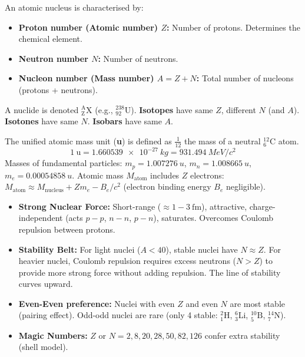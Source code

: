\documentclass[11pt]{article}
\begin{document}
\begin{definition}
An atomic nucleus is characterised by:
\begin{itemize}
\item \textbf{Proton number (Atomic number) $Z$:} Number of protons. Determines the chemical element.
\item \textbf{Neutron number $N$:} Number of neutrons.
\item \textbf{Nucleon number (Mass number) $A = Z + N$:} Total number of nucleons (protons + neutrons).
\end{itemize}
A nuclide is denoted $\ensuremath{\mathrm{^{A}_{Z}X}}$ (e.g., $\ensuremath{\mathrm{^{238}_{92}U}}$). \textbf{Isotopes} have same $Z$, different $N$ (and $A$). \textbf{Isotones} have same $N$. \textbf{Isobars} have same $A$.
\end{definition}

\begin{definition}
The unified atomic mass unit (\textbf{u}) is defined as $\frac{1}{12}$ the mass of a neutral $\ensuremath{\mathrm{^{12}_{6}C}}$ atom.
\[
1\ \text{u} = \SI{1.660539e-27}{kg} = \SI{931.494}{MeV/c^2}
\]
Masses of fundamental particles:
$m_p = \SI{1.007276}{u}$, $m_n = \SI{1.008665}{u}$, $m_e = \SI{0.00054858}{u}$.
Atomic mass $M_{\text{atom}}$ includes $Z$ electrons: $M_{\text{atom}} \approx M_{\text{nucleus}} + Z m_e - B_e/c^2$ (electron binding energy $B_e$ negligible).
\end{definition}

\begin{propriete}
\begin{itemize}
\item \textbf{Strong Nuclear Force:} Short-range ($\approx 1-3\ \text{fm}$), attractive, charge-independent (acts $p-p$, $n-n$, $p-n$), saturates. Overcomes Coulomb repulsion between protons.
\item \textbf{Stability Belt:} For light nuclei ($A < 40$), stable nuclei have $N \approx Z$. For heavier nuclei, Coulomb repulsion requires excess neutrons ($N > Z$) to provide more strong force without adding repulsion. The line of stability curves upward.
\item \textbf{Even-Even preference:} Nuclei with even $Z$ and even $N$ are most stable (pairing effect). Odd-odd nuclei are rare (only 4 stable: $\ensuremath{\mathrm{^{2}_{1}H}}$, $\ensuremath{\mathrm{^{6}_{3}Li}}$, $\ensuremath{\mathrm{^{10}_{5}B}}$, $\ensuremath{\mathrm{^{14}_{7}N}}$).
\item \textbf{Magic Numbers:} $Z$ or $N = 2, 8, 20, 28, 50, 82, 126$ confer extra stability (shell model).
\end{itemize}
\end{propriete}
\end{document}
